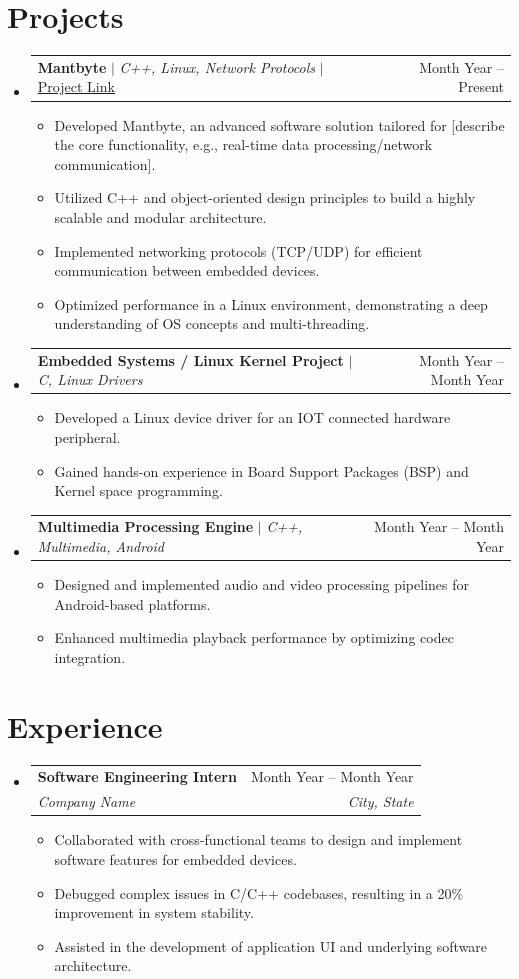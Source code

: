 \documentclass[letterpaper,11pt]{article}
\makeatletter
\newcommand{\resumeItem}[1]{
  \item\small{
    {#1 \vspace{-2pt}}
  }
}
\newcommand{\resumeSubheading}[4]{
  \vspace{-2pt}\item
    \begin{tabular*}{0.97\textwidth}[t]{l@{\extracolsep{\fill}}r}
      \textbf{#1} & #2 \\
      \textit{\small#3} & \textit{\small #4} \\
    \end{tabular*}\vspace{-7pt}
}
\newcommand{\resumeProjectHeading}[2]{
    \item
    \begin{tabular*}{0.97\textwidth}{l@{\extracolsep{\fill}}r}
      \small#1 & #2 \\
    \end{tabular*}\vspace{-7pt}
}
\newcommand{\resumeSubHeadingListStart}{\begin{itemize}[leftmargin=0.15in, label={}]}
\newcommand{\resumeSubHeadingListEnd}{\end{itemize}}
\newcommand{\resumeItemListStart}{\begin{itemize}}
\newcommand{\resumeItemListEnd}{\end{itemize}\vspace{-5pt}}
\makeatother
\begin{document}
\section{Projects}
    \resumeSubHeadingListStart
      \resumeProjectHeading
          {\textbf{Mantbyte} $|$ \emph{C++, Linux, Network Protocols} $|$ \href{https://github.com/yourgithub/mantbyte}{\underline{Project Link}}}{Month Year -- Present}
          \resumeItemListStart
            \resumeItem{Developed Mantbyte, an advanced software solution tailored for [describe the core functionality, e.g., real-time data processing/network communication].}
            \resumeItem{Utilized C++ and object-oriented design principles to build a highly scalable and modular architecture.}
            \resumeItem{Implemented networking protocols (TCP/UDP) for efficient communication between embedded devices.}
            \resumeItem{Optimized performance in a Linux environment, demonstrating a deep understanding of OS concepts and multi-threading.}
          \resumeItemListEnd

      \resumeProjectHeading
          {\textbf{Embedded Systems / Linux Kernel Project} $|$ \emph{C, Linux Drivers}}{Month Year -- Month Year}
          \resumeItemListStart
            \resumeItem{Developed a Linux device driver for an IOT connected hardware peripheral.}
            \resumeItem{Gained hands-on experience in Board Support Packages (BSP) and Kernel space programming.}
          \resumeItemListEnd
          
      \resumeProjectHeading
          {\textbf{Multimedia Processing Engine} $|$ \emph{C++, Multimedia, Android}}{Month Year -- Month Year}
          \resumeItemListStart
            \resumeItem{Designed and implemented audio and video processing pipelines for Android-based platforms.}
            \resumeItem{Enhanced multimedia playback performance by optimizing codec integration.}
          \resumeItemListEnd
    \resumeSubHeadingListEnd

\section{Experience}
  \resumeSubHeadingListStart
    \resumeSubheading
      {Software Engineering Intern}{Month Year -- Month Year}
      {Company Name}{City, State}
      \resumeItemListStart
        \resumeItem{Collaborated with cross-functional teams to design and implement software features for embedded devices.}
        \resumeItem{Debugged complex issues in C/C++ codebases, resulting in a 20\% improvement in system stability.}
        \resumeItem{Assisted in the development of application UI and underlying software architecture.}
      \resumeItemListEnd
  \resumeSubHeadingListEnd
\end{document}
